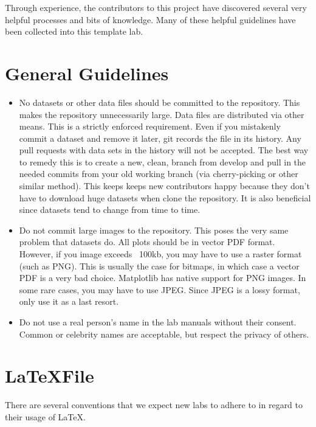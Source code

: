\label{lab:template}

Through experience, the contributors to this project have discovered several very helpful processes and bits of knowledge.
Many of these helpful guidelines have been collected into this template lab.

\section*{General Guidelines}
\begin{itemize}
\item No datasets or other data files should be committed to the repository.
This makes the repository unnecessarily large.
Data files are distributed via other means.
This is a strictly enforced requirement.
Even if you mistakenly commit a dataset and remove it later, git records the file in its history.
Any pull requests with data sets in the history will not be accepted.
The best way to remedy this is to create a new, clean, branch from develop and pull in the needed commits from your old working branch (via cherry-picking or other similar method).
This keeps keeps new contributors happy because they don't have to download huge datasets when clone the repository.
It is also beneficial since datasets tend to change from time to time.
\item Do not commit large images to the repository.
This poses the very same problem that datasets do.
All plots should be in vector PDF format.
However, if you image exceeds ~100kb, you may have to use a raster format (such as PNG).
This is usually the case for bitmaps, in which case a vector PDF is a very bad choice.
Matplotlib has native support for PNG images.
In some rare cases, you may have to use JPEG.
Since JPEG is a lossy format, only use it as a last resort.
\item Do not use a real person's name in the lab manuals without their consent.
Common or celebrity names are acceptable, but respect the privacy of others.
\end{itemize}

\section*{\LaTeX File}
There are several conventions that we expect new labs to adhere to in regard to their usage of \LaTeX.

